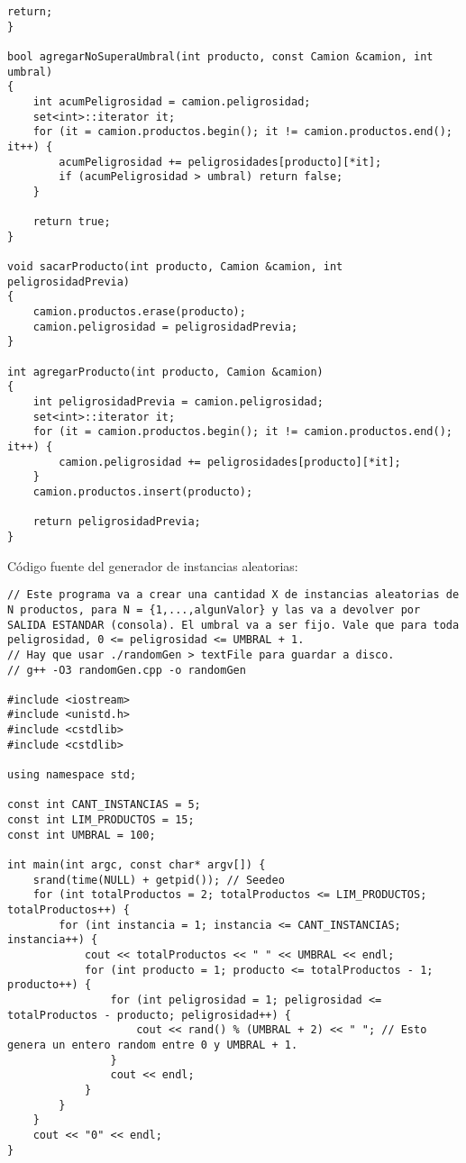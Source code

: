 \begin{lstlisting}[frame=single]
    return;
}

bool agregarNoSuperaUmbral(int producto, const Camion &camion, int umbral)
{
    int acumPeligrosidad = camion.peligrosidad;
    set<int>::iterator it;
    for (it = camion.productos.begin(); it != camion.productos.end(); it++) {
        acumPeligrosidad += peligrosidades[producto][*it];
        if (acumPeligrosidad > umbral) return false;
    }
    
    return true;
}

void sacarProducto(int producto, Camion &camion, int peligrosidadPrevia)
{
    camion.productos.erase(producto);
    camion.peligrosidad = peligrosidadPrevia;
}

int agregarProducto(int producto, Camion &camion)
{
    int peligrosidadPrevia = camion.peligrosidad;
    set<int>::iterator it;
    for (it = camion.productos.begin(); it != camion.productos.end(); it++) {
        camion.peligrosidad += peligrosidades[producto][*it];
    }
    camion.productos.insert(producto);
    
    return peligrosidadPrevia;
}
\end{lstlisting}

Código fuente del generador de instancias aleatorias:
\begin{lstlisting}[frame=single]
// Este programa va a crear una cantidad X de instancias aleatorias de N productos, para N = {1,...,algunValor} y las va a devolver por SALIDA ESTANDAR (consola). El umbral va a ser fijo. Vale que para toda peligrosidad, 0 <= peligrosidad <= UMBRAL + 1.
// Hay que usar ./randomGen > textFile para guardar a disco.
// g++ -O3 randomGen.cpp -o randomGen

#include <iostream>
#include <unistd.h>
#include <cstdlib>
#include <cstdlib>

using namespace std;

const int CANT_INSTANCIAS = 5;
const int LIM_PRODUCTOS = 15;
const int UMBRAL = 100;

int main(int argc, const char* argv[]) {
    srand(time(NULL) + getpid()); // Seedeo
    for (int totalProductos = 2; totalProductos <= LIM_PRODUCTOS; totalProductos++) {
        for (int instancia = 1; instancia <= CANT_INSTANCIAS; instancia++) {
            cout << totalProductos << " " << UMBRAL << endl;
            for (int producto = 1; producto <= totalProductos - 1; producto++) {
                for (int peligrosidad = 1; peligrosidad <= totalProductos - producto; peligrosidad++) {
                    cout << rand() % (UMBRAL + 2) << " "; // Esto genera un entero random entre 0 y UMBRAL + 1.
                }
                cout << endl;
            }
        }
    }
    cout << "0" << endl;
}
\end{lstlisting}

